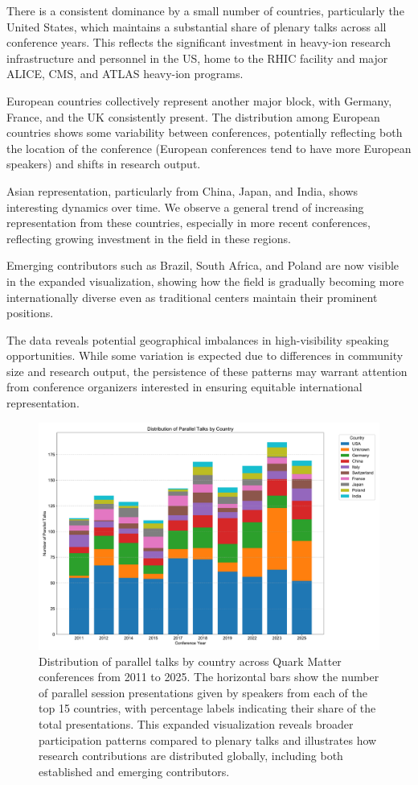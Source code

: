 \documentclass[a4paper,11pt]{article}
\begin{document}
There is a consistent dominance by a small number of countries, particularly the United States, which maintains a substantial share of plenary talks across all conference years. This reflects the significant investment in heavy-ion research infrastructure and personnel in the US, home to the RHIC facility and major ALICE, CMS, and ATLAS heavy-ion programs.

European countries collectively represent another major block, with Germany, France, and the UK consistently present. The distribution among European countries shows some variability between conferences, potentially reflecting both the location of the conference (European conferences tend to have more European speakers) and shifts in research output.

Asian representation, particularly from China, Japan, and India, shows interesting dynamics over time. We observe a general trend of increasing representation from these countries, especially in more recent conferences, reflecting growing investment in the field in these regions.

Emerging contributors such as Brazil, South Africa, and Poland are now visible in the expanded visualization, showing how the field is gradually becoming more internationally diverse even as traditional centers maintain their prominent positions.

The data reveals potential geographical imbalances in high-visibility speaking opportunities. While some variation is expected due to differences in community size and research output, the persistence of these patterns may warrant attention from conference organizers interested in ensuring equitable international representation.

\begin{figure}[H]
\centering
\includegraphics[width=\textwidth]{figures/parallel_talks_by_country.pdf}
\caption{Distribution of parallel talks by country across Quark Matter conferences from 2011 to 2025. The horizontal bars show the number of parallel session presentations given by speakers from each of the top 15 countries, with percentage labels indicating their share of the total presentations. This expanded visualization reveals broader participation patterns compared to plenary talks and illustrates how research contributions are distributed globally, including both established and emerging contributors.}
\label{fig:country_parallel}
\end{figure}
\end{document}
